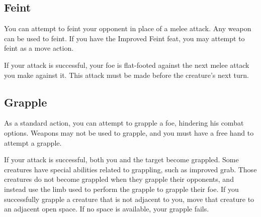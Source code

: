 \subsection{Feint}
You can attempt to feint your opponent in place of a melee attack. Any weapon can be used to feint. If you have the Improved Feint feat, you may attempt to feint as a move action.

If your attack is successful, your foe is flat-footed against the next melee attack you make against it. This attack must be made before the creature's next turn.

\subsection{Grapple}
As a standard action, you can attempt to grapple a foe, hindering his combat options. Weapons may not be used to grapple, and you must have a free hand to attempt a grapple.

\par If your attack is successful, both you and the target become grappled. Some creatures have special abilities related to grappling, such as improved grab. Those creatures do not become grappled when they grapple their opponents, and instead use the limb used to perform the grapple to grapple their foe. If you successfully grapple a creature that is not adjacent to you, move that creature to an adjacent open space. If no space is available, your grapple fails.

